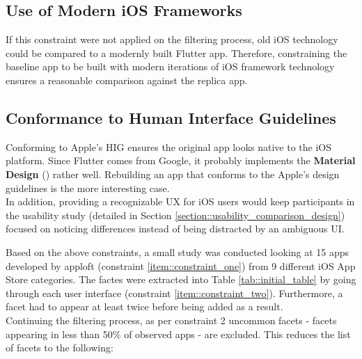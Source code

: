 \subsection*{Use of Modern iOS Frameworks}
If this constraint were not applied on the filtering process, old iOS technology could be compared to a modernly built Flutter app. 
Therefore, constraining the baseline app to be built with modern iterations of iOS framework technology ensures a reasonable comparison 
against the replica app.\\


\subsection*{Conformance to Human Interface Guidelines}
Conforming to Apple's HIG ensures the original app looks native to the iOS platform.
Since Flutter comes from Google, it probably implements the \textbf{Material Design} (\cite{Google2021}) rather well. Rebuilding an app that conforms to the Apple's design guidelines is the more interesting case.\\
In addition, providing a recognizable UX for iOS users would keep participants in the usability study (detailed in Section \ref{section::usability_comparison_design}) focused on noticing differences instead of 
being distracted by an ambiguous UI.\\
\hfill \break

Based on the above constraints, a small study was conducted looking at 15 apps developed by apploft (constraint \ref{item::constraint_one}) from 9 different iOS App Store categories. 
The factes were extracted into Table \ref{tab::initial_table} by going through each user interface (constraint \ref{item::constraint_two}).
Furthermore, a facet had to appear at least twice before being added as a result.\\
Continuing the filtering process, as per constraint 2 uncommon facets - facets appearing
in less than 50\% of observed apps - are excluded. This reduces the list of facets to the following:

